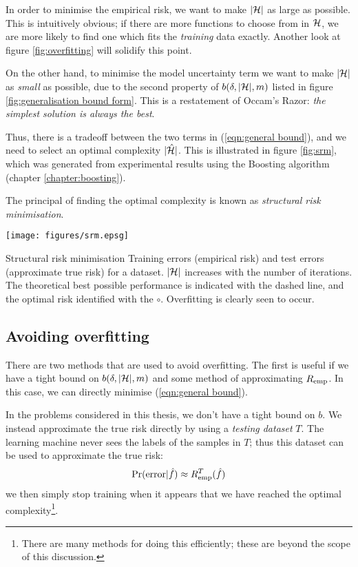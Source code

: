 In order to minimise the empirical risk, we want to make $|\mathcal{H}|$ as
large as possible.  This is intuitively obvious; if there are more
functions to choose from in $\mathcal{H}$, we are more likely to find one
which fits the \emph{training} data exactly.  Another look at figure
\ref{fig:overfitting} will solidify this point.

On the other hand, to minimise the model uncertainty term we want to make
$|\mathcal{H}|$ as \emph{small} as possible, due to the second property of
$b(\delta, |\mathcal{H}|, m)$ listed in figure \ref{fig:generalisation bound
form}.  This is a restatement of Occam's Razor: \emph{the simplest
solution is always the best}.

Thus, there is a tradeoff between the two terms in (\ref{eqn:general
bound}), and we need to select an optimal complexity $|\hat{\mathcal{H}}|$.
This is illustrated in figure \ref{fig:srm}, which was generated from
experimental results using the Boosting algorithm (chapter
\ref{chapter:boosting}).

The principal of finding the optimal complexity is known as
\emph{structural risk minimisation}.

\begin{linefigure}
\begin{center}
\texttt{[image: figures/srm.epsg]}
\end{center}
\begin{capt}{Structural risk minimisation}
Training errors (empirical risk) and test errors (approximate true
risk) for a dataset.  $|\mathcal{H}|$ increases with the number of
iterations.  The theoretical best possible performance is
indicated with the dashed line, and the optimal risk identified with
the $\circ$.  Overfitting is clearly seen to occur.
\end{capt}
\label{fig:overfitting}
\end{linefigure}

\subsection{Avoiding overfitting}

There are two methods that are used to avoid overfitting.  The first
is useful if we have a tight bound on $b(\delta, |\mathcal{H}|, m)$ and some
method of approximating $R_{\mathrm{emp}}$.  In this case, we can directly
minimise (\ref{eqn:general bound}).

In the problems considered in this thesis, we don't have a tight bound
on $b$.  We instead 
approximate the true risk directly by using a \emph{testing dataset}
$T$.  The learning machine never sees the labels of the samples in
$T$; thus this dataset can be used to approximate the true risk:
%
\begin{equation}
\Pr(\mathrm{error}|\hat{f}) \approx R_{\mathrm{emp}}^{T}(\hat{f})
\end{equation}
%
we then simply stop training when it appears that we have reached the
optimal complexity\footnote{There are many methods for doing this efficiently;
these are beyond the scope of this discussion.}.

